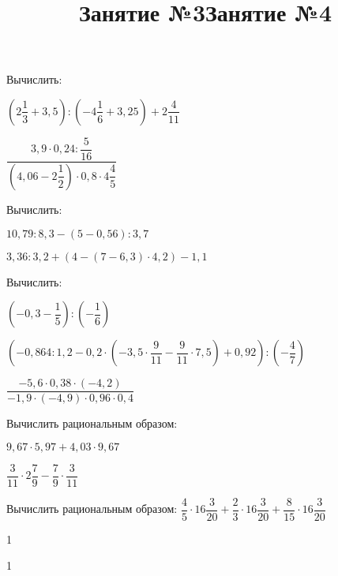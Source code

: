 \begin{listofex}
	\item Вычислить:
	\begin{enumcols}[itemcolumns=2]
		\item \( \left( 2\dfrac{1}{3}+3,5 \right):\left( -4\dfrac{1}{6}+3,25 \right)+2\dfrac{4}{11} \)
		\item \( \dfrac{3,9\cdot0,24:\dfrac{5}{16}}{\left( 4,06-2\dfrac{1}{2} \right)\cdot0,8\cdot4\dfrac{4}{5}} \)
	\end{enumcols}
	\item Вычислить:
	\begin{enumcols}[itemcolumns=2]
		\item \( 10,79:8,3-(5-0,56):3,7 \)
		\item \( 3,36:3,2+(4-(7-6,3)\cdot4,2)-1,1 \)
	\end{enumcols}
	\item Вычислить:
	\begin{enumcols}[itemcolumns=1]
		\item \( \left( -0,3-\dfrac{1}{5} \right):\left( -\dfrac{1}{6} \right) \)
		\item \( \left( -0,864:1,2-0,2\cdot\left( -3,5\cdot\dfrac{9}{11}-\dfrac{9}{11}\cdot7,5 \right)+0,92 \right):\left( -\dfrac{4}{7} \right) \)
		\item \( \dfrac{-5,6\cdot0,38\cdot(-4,2)}{-1,9\cdot(-4,9)\cdot0,96\cdot0,4} \)
	\end{enumcols}
	\item Вычислить рациональным образом:
	\begin{enumcols}[itemcolumns=2]
		\item \( 9,67\cdot5,97+4,03\cdot9,67 \)
		\item \( \dfrac{3}{11}\cdot2\dfrac{7}{9}-\dfrac{7}{9}\cdot\dfrac{3}{11} \)
	\end{enumcols}
	\item Вычислить рациональным образом: \( \dfrac{4}{5}\cdot16\dfrac{3}{20}+\dfrac{2}{3}\cdot16\dfrac{3}{20}+\dfrac{8}{15}\cdot16\dfrac{3}{20} \)
\end{listofex}
\newpage
\title{Занятие №3}
\begin{listofex}
	\item 1
	
\end{listofex}
\newpage
\title{Занятие №4}
\begin{listofex}
	\item 1
	
\end{listofex}
\newpage
